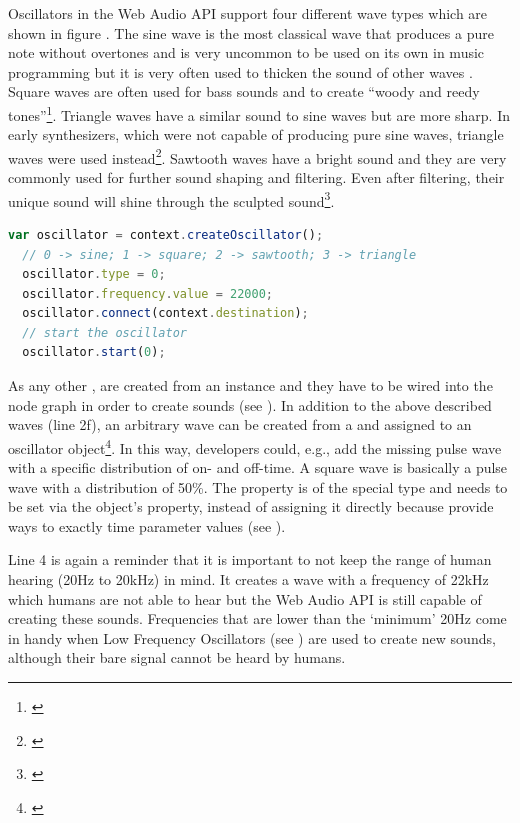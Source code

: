 Oscillators in the Web Audio API support four different wave types which are shown in figure  \cite{wilson2014webaudiospec}. The sine wave is the most classical wave that produces a pure note without overtones and is very uncommon to be used on its own in music programming but it is very often used to thicken the sound of other waves \cite[chapter: 2, Sine Wave]{cannAnalogSynthesis}. Square waves are often used for bass sounds and to create ``woody and reedy tones''\footnote{\cite[chapter: 2, Square Wave]{cannAnalogSynthesis}}. Triangle waves have a similar sound to sine waves but are more sharp. In early synthesizers, which were not capable of producing pure sine waves, triangle waves were used instead\footnote{\cite[chapter: 2, Triangle Wave]{cannAnalogSynthesis}}. Sawtooth waves have a bright sound and they are very commonly used for further sound shaping and filtering. Even after filtering, their unique sound will shine through the sculpted sound\footnote{\cite[chapter: 2, Sawtooth Wave]{cannAnalogSynthesis}}.

\begin{lstlisting}[language=JavaScript, caption=Playing a sound from an oscillator, label=lst:webaudiooscillator]
  var oscillator = context.createOscillator();
  // 0 -> sine; 1 -> square; 2 -> sawtooth; 3 -> triangle
  oscillator.type = 0;
  oscillator.frequency.value = 22000;
  oscillator.connect(context.destination);
  // start the oscillator
  oscillator.start(0);
\end{lstlisting}

As any other ,  are created from an  instance and they have to be wired into the node graph in order to create sounds (see ). In addition to the above described waves (line 2f), an arbitrary wave can be created from a  and assigned to an oscillator object\footnote{\cite[createPeriodicWave]{wilson2014webaudiospec}}. In this way, developers could, e.g., add the missing pulse wave with a specific distribution of on- and off-time. A square wave is basically a pulse wave with a distribution of 50\%. The  property is of the special type  and needs to be set via the object's  property, instead of assigning it directly because  provide ways to exactly time parameter values (see ).

Line 4 is again a reminder that it is important to not keep the range of human hearing (20Hz to 20kHz) in mind. It creates a wave with a frequency of 22kHz which humans are not able to hear but the Web Audio API is still capable of creating these sounds. Frequencies that are lower than the `minimum' 20Hz come in handy when Low Frequency Oscillators (see ) are used to create new sounds, although their bare signal cannot be heard by humans.